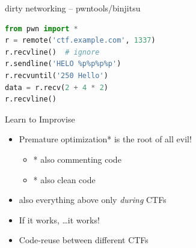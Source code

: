 
\begin{frame}[fragile]
  {dirty networking -- pwntools/binjitsu}

  \begin{lstlisting}[language=python]
from pwn import *
r = remote('ctf.example.com', 1337)
r.recvline()  # ignore
r.sendline('HELO %p%p%p%p')
r.recvuntil('250 Hello')
data = r.recv(2 + 4 * 2)
r.recvline()
  \end{lstlisting}
\end{frame}










\begin{frame}
  {Learn to Improvise}

  \begin{itemize}
    \item Premature optimization* is the root of all evil!
      \begin{itemize}
        \item * also commenting code
        \item * also clean code
      \end{itemize}
    \item also everything above only \emph{during} CTFs
    \item If it works, \ldots it works!
    \item Code-reuse between different CTFs
  \end{itemize}

\end{frame}


\begin{frame}
  {}
\end{frame}
